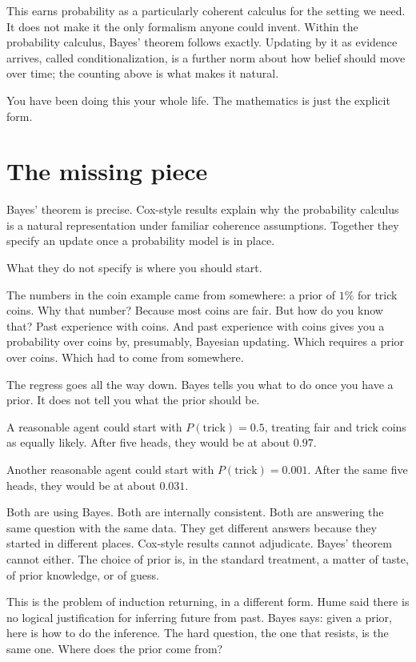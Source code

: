 This earns probability as a particularly coherent calculus for the setting we need. It does not make it the only formalism anyone could invent. Within the probability calculus, Bayes' theorem follows exactly. Updating by it as evidence arrives, called conditionalization, is a further norm about how belief should move over time; the counting above is what makes it natural.

You have been doing this your whole life. The mathematics is just the explicit form.

\section*{The missing piece}

Bayes' theorem is precise. Cox-style results explain why the probability calculus is a natural representation under familiar coherence assumptions. Together they specify an update once a probability model is in place.

What they do not specify is where you should start.

The numbers in the coin example came from somewhere: a prior of $1\%$ for trick coins. Why that number? Because most coins are fair. But how do you know that? Past experience with coins. And past experience with coins gives you a probability over coins by, presumably, Bayesian updating. Which requires a prior over coins. Which had to come from somewhere.

The regress goes all the way down. Bayes tells you what to do once you have a prior. It does not tell you what the prior should be.

A reasonable agent could start with $P(\text{trick}) = 0.5$, treating fair and trick coins as equally likely. After five heads, they would be at about $0.97$.

Another reasonable agent could start with $P(\text{trick}) = 0.001$. After the same five heads, they would be at about $0.031$.

Both are using Bayes. Both are internally consistent. Both are answering the same question with the same data. They get different answers because they started in different places. Cox-style results cannot adjudicate. Bayes' theorem cannot either. The choice of prior is, in the standard treatment, a matter of taste, of prior knowledge, or of guess.

This is the problem of induction returning, in a different form. Hume said there is no logical justification for inferring future from past. Bayes says: given a prior, here is how to do the inference. The hard question, the one that resists, is the same one. Where does the prior come from?


